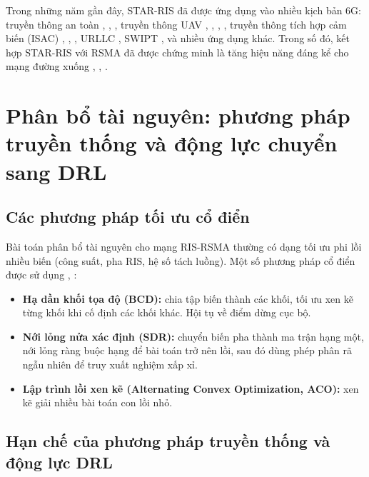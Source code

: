 Trong những năm gần đây, STAR-RIS đã được ứng dụng vào nhiều kịch bản 6G:
truyền thông an toàn \cite{kamal2024optimizing}, \cite{zhang2024starrismatrans}, \cite{yang2024covertambc}, truyền thông UAV \cite{singh2024robust}, \cite{perdana2024adaptive}, \cite{huang2024starrisuav}, \cite{nguyen2025star}, truyền thông tích hợp cảm biến
(ISAC) \cite{jin2024arisrsma}, \cite{to2024fairness}, \cite{adams2024rsma},
URLLC \cite{soleymani2024starris}, SWIPT \cite{amiri2024meta}, và nhiều
ứng dụng khác. Trong số đó, kết hợp STAR-RIS với RSMA đã được chứng minh
là tăng hiệu năng đáng kể cho mạng đường xuống \cite{soleymani2024starris}, \cite{gomes2024performance}, \cite{ibrahim2025cognitive}.

\section{Phân bổ tài nguyên: phương pháp truyền thống và động lực chuyển sang DRL}
\label{sec:resource_allocation}

\subsection{Các phương pháp tối ưu cổ điển}

Bài toán phân bổ tài nguyên cho mạng RIS-RSMA thường có dạng tối ưu phi
lồi nhiều biến (công suất, pha RIS, hệ số tách luồng). Một số phương pháp
cổ điển được sử dụng \cite{mao2022rsma}, \cite{gomes2024performance}:

\begin{itemize}[leftmargin=*]
\item \textbf{Hạ dần khối tọa độ (BCD):} chia tập biến thành các khối, tối
ưu xen kẽ từng khối khi cố định các khối khác. Hội tụ về điểm dừng cục bộ.
\item \textbf{Nới lỏng nửa xác định (SDR):} chuyển biến pha thành ma trận
hạng một, nới lỏng ràng buộc hạng để bài toán trở nên lồi, sau đó dùng
phép phân rã ngẫu nhiên để truy xuất nghiệm xấp xỉ.
\item \textbf{Lập trình lồi xen kẽ (Alternating Convex Optimization, ACO):}
xen kẽ giải nhiều bài toán con lồi nhỏ.
\end{itemize}

\subsection{Hạn chế của phương pháp truyền thống và động lực DRL}

